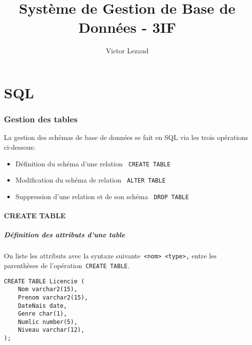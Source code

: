 \documentclass[10pt,a4paper,twoside]{article}
\author{Victor Lezaud}
\title{Système de Gestion de Base de Données - 3IF}
\begin{document}
\maketitle
\renewcommand{\contentsname}{Sommaire}
\tableofcontents

\newpage

\part{SQL}

\section{Gestion des tables}
La gestion des schémas de base de données se fait en SQL via les trois opérations ci-dessous:
\begin{itemize}
\item Définition du schéma d'une relation \verb= CREATE TABLE=
\item Modification du schéma de relation \verb= ALTER TABLE=
\item Suppression d'une relation et de son schéma \verb= DROP TABLE=
\end{itemize}

\subsection{CREATE TABLE}
\subsubsection{Définition des attributs d'une table} 
On liste les attributs avec la syntaxe suivante\verb= <nom> <type>,= entre les parenthèses de l'opération\verb= CREATE TABLE=.
\begin{verbatim}
CREATE TABLE Licencie (
    Nom varchar2(15),
    Prenom varchar2(15),
    DateNais date,
    Genre char(1),
    Numlic number(5),
    Niveau varchar(12),
);
\end{verbatim}
\end{document}
